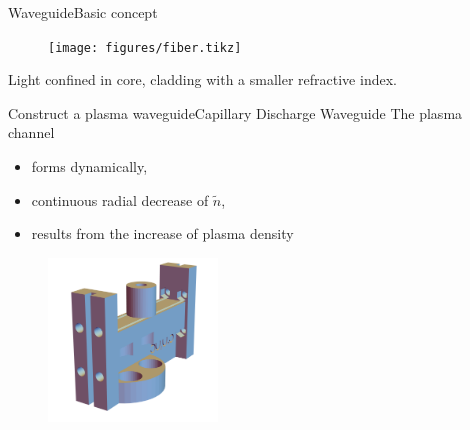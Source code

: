 \documentclass[]{beamer}
\begin{document}
  \begin{frame}{Waveguide}{Basic concept}
  \begin{figure}
     \texttt{[image: figures/fiber.tikz]}
   \end{figure}
   Light confined in core, cladding with a smaller refractive index.
  \end{frame}
  \begin{frame}{Construct a plasma waveguide}{Capillary Discharge Waveguide}
    The plasma channel
    \begin{itemize}
      \item[\textbullet] forms dynamically,
      \item[\textbullet] continuous radial decrease of $\tilde n$,
      \item[\textbullet] results from the increase of plasma density
    \end{itemize}
    \begin{figure}
      \includegraphics[width=0.4\textwidth]{figures/theory/gasfilled.png}
    \end{figure}
  \end{frame}
\end{document}
